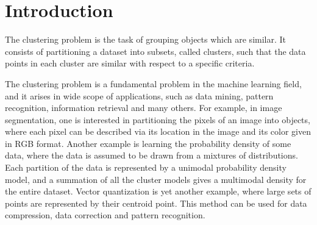 \documentclass[12pt]{article}
\numberwithin{equation}{section}
\begin{document}
%
%
%
%
%
%
%
%
%
%
%
%
%
%
%
%
%
%
%
%
%

\tableofcontents
\clearpage
{%
\let\oldnumberline\numberline%
\renewcommand{\numberline}{\figurename~\oldnumberline}%
\listoffigures%
}
\clearpage

\section{Introduction}

The clustering problem is the task of grouping objects which are similar. It consists of partitioning a dataset into subsets, called clusters, such that the data points in each cluster are similar with respect to a specific criteria. 

The clustering problem is a fundamental problem in the machine learning field, and it arises in wide scope of applications, such as data mining, pattern recognition, information retrieval and many others. For example, in image segmentation, one is interested in partitioning the pixels of an image into objects, where each pixel can be described via its location in the image and its color given in RGB format. Another example is learning the probability density of some data, where the data is assumed to be drawn from a mixtures of distributions. Each partition of the data is represented by a unimodal probability density model, and a summation of all the cluster models gives a multimodal density for the entire dataset. Vector quantization is yet another example, where large sets of points are represented by their centroid point. This method can be used for data compression, data correction and pattern recognition.
\end{document}
